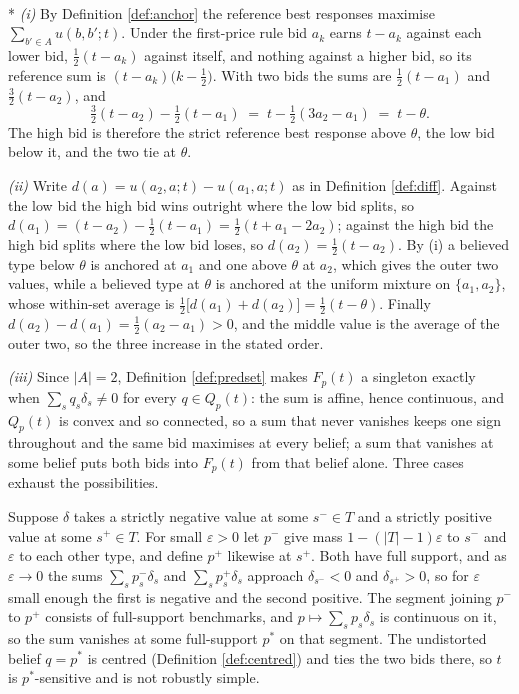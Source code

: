 \documentclass[12pt]{article}
\makeatletter
\theoremstyle{definition}
\renewenvironment{proof}[1][\proofname]{\par
  \pushQED{\qed}%
  \normalfont \topsep6\p@\@plus6\p@\relax
  \trivlist
  \item[\hskip\labelsep\itshape #1\@addpunct{.}]\mbox{}\\*
  \ignorespaces
}{%
  \popQED\endtrivlist\@endpefalse
}
\makeatother
\begin{document}
\begin{proof}[Proof of Corollary \ref{prop:cap}]\emph{(i)} By Definition \ref{def:anchor} the reference best responses maximise $\sum_{b' \in A} u(b, b'; t)$. Under the first-price rule bid $a_k$ earns $t - a_k$ against each lower bid, $\tfrac12 (t - a_k)$ against itself, and nothing against a higher bid, so its reference sum is $(t - a_k)\bigl(k - \tfrac12\bigr)$. With two bids the sums are $\tfrac12 (t - a_1)$ and $\tfrac32 (t - a_2)$, and
\[
\tfrac32 (t - a_2) - \tfrac12 (t - a_1) \;=\; t - \tfrac12 (3a_2 - a_1) \;=\; t - \theta .
\]
The high bid is therefore the strict reference best response above $\theta$, the low bid below it, and the two tie at $\theta$.

\emph{(ii)} Write $d(a) = u(a_2, a; t) - u(a_1, a; t)$ as in Definition \ref{def:diff}. Against the low bid the high bid wins outright where the low bid splits, so $d(a_1) = (t - a_2) - \tfrac12 (t - a_1) = \tfrac12 (t + a_1 - 2a_2)$; against the high bid the high bid splits where the low bid loses, so $d(a_2) = \tfrac12 (t - a_2)$. By (i) a believed type below $\theta$ is anchored at $a_1$ and one above $\theta$ at $a_2$, which gives the outer two values, while a believed type at $\theta$ is anchored at the uniform mixture on $\{a_1, a_2\}$, whose within-set average is $\tfrac12\bigl[d(a_1) + d(a_2)\bigr] = \tfrac12 (t - \theta)$. Finally $d(a_2) - d(a_1) = \tfrac12 (a_2 - a_1) > 0$, and the middle value is the average of the outer two, so the three increase in the stated order.

\emph{(iii)} Since $|A| = 2$, Definition \ref{def:predset} makes $F_p(t)$ a singleton exactly when $\sum_s q_s \delta_s \neq 0$ for every $q \in Q_p(t)$: the sum is affine, hence continuous, and $Q_p(t)$ is convex and so connected, so a sum that never vanishes keeps one sign throughout and the same bid maximises at every belief; a sum that vanishes at some belief puts both bids into $F_p(t)$ from that belief alone. Three cases exhaust the possibilities.

Suppose $\delta$ takes a strictly negative value at some $s^- \in T$ and a strictly positive value at some $s^+ \in T$. For small $\varepsilon > 0$ let $p^-$ give mass $1 - (|T| - 1)\varepsilon$ to $s^-$ and $\varepsilon$ to each other type, and define $p^+$ likewise at $s^+$. Both have full support, and as $\varepsilon \to 0$ the sums $\sum_s p^-_s \delta_s$ and $\sum_s p^+_s \delta_s$ approach $\delta_{s^-} < 0$ and $\delta_{s^+} > 0$, so for $\varepsilon$ small enough the first is negative and the second positive. The segment joining $p^-$ to $p^+$ consists of full-support benchmarks, and $p \mapsto \sum_s p_s \delta_s$ is continuous on it, so the sum vanishes at some full-support $p^\ast$ on that segment. The undistorted belief $q = p^\ast$ is centred (Definition \ref{def:centred}) and ties the two bids there, so $t$ is $p^\ast$-sensitive and is not robustly simple.


\end{proof}
\end{document}
